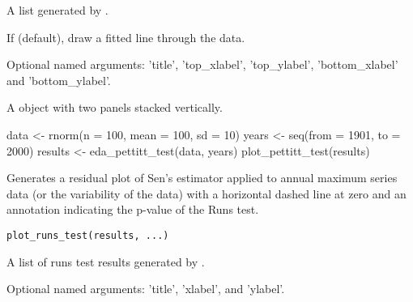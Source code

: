 \documentclass[a4paper]{book}
\begin{document}
%
\begin{Arguments}
\begin{ldescription}
\item[\code{results}] A list generated by .

\item[\code{show\_line}] If  (default), draw a fitted line through the data.

\item[\code{...}] Optional named arguments: 'title', 'top\_xlabel', 'top\_ylabel',
'bottom\_xlabel' and 'bottom\_ylabel'.
\end{ldescription}
\end{Arguments}
%
\begin{Value}
A  object with two  panels stacked vertically.
\end{Value}
%
\begin{SeeAlso}
\end{SeeAlso}
%
\begin{Examples}
\begin{ExampleCode}
data <- rnorm(n = 100, mean = 100, sd = 10)
years <- seq(from = 1901, to = 2000)
results <- eda_pettitt_test(data, years)
plot_pettitt_test(results)

\end{ExampleCode}
\end{Examples}
%
\begin{Description}
Generates a residual plot of Sen’s estimator applied to annual maximum series
data (or the variability of the data) with a horizontal dashed line at
zero and an annotation indicating the p-value of the Runs test.
\end{Description}
%
\begin{Usage}
\begin{verbatim}
plot_runs_test(results, ...)
\end{verbatim}
\end{Usage}
%
\begin{Arguments}
\begin{ldescription}
\item[\code{results}] A list of runs test results generated by .

\item[\code{...}] Optional named arguments: 'title', 'xlabel', and 'ylabel'.
\end{ldescription}
\end{Arguments}
\end{document}
